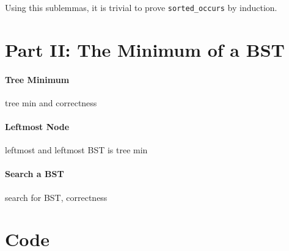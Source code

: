 \documentclass[a4paper]{article}
\begin{document}
Using this sublemmas, it is trivial to prove \texttt{sorted\_occurs} by induction.

\section{Part II: The Minimum of a BST}

\paragraph{Tree Minimum}

tree min and correctness
 
\paragraph{Leftmost Node}

leftmost and leftmost BST is tree min

\paragraph{Search a BST}

search for BST, correctness

\appendix

\section{Code}


\end{document}
